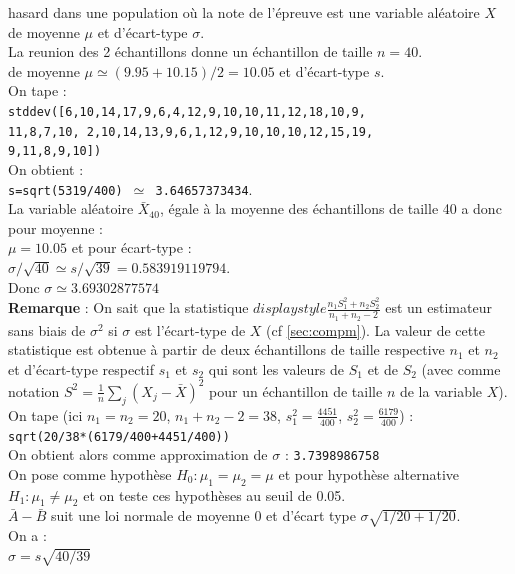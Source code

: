 \documentclass[a4paper,11pt]{book}
\begin{document}
\begin{itemize}
hasard dans une population o\`u la note de l'\'epreuve est une variable 
al\'eatoire $X$ de moyenne $\mu$ et d'\'ecart-type $\sigma$.\\
La reunion des 2 \'echantillons donne un \'echantillon de taille $n=40$.\\
de moyenne $\mu \simeq (9.95+10.15)/2=10.05$ et d'\'ecart-type $s$.\\
On tape :\\ 
{\tt stddev([6,10,14,17,9,6,4,12,9,10,10,11,12,18,10,9,\\
11,8,7,10, 2,10,14,13,9,6,1,12,9,10,10,10,12,15,19,}\\
{\tt 9,11,8,9,10])}\\
On obtient :\\
{\tt s=sqrt(5319/400) $\simeq$ 3.64657373434}.\\
La variable al\'eatoire $\bar X_{40}$, \'egale \`a la moyenne des \'echantillons de taille 40 a donc pour moyenne :\\
$\mu=10.05$ 
et pour \'ecart-type :\\
$\sigma/\sqrt{40}\simeq s/\sqrt{39}=0.583919119794$.\\
Donc $\sigma \simeq 3.69302877574$\\
{\bf Remarque} : On sait que la statistique 
$displaystyle \frac{n_1S_1^2+n_2S_2^2}{n_1+n_2-2}$
 est un estimateur sans biais de $\sigma^2$ si $\sigma$ est l'\'ecart-type de 
$X$ (cf \ref{sec:compm}). La valeur
de cette statistique est obtenue \`a partir de 
deux \'echantillons de taille 
respective $n_1$ et $n_2$ et d'\'ecart-type respectif $s_1$ et $s_2$ qui sont les valeurs de $S_1$ et de $S_2$ (avec comme notation 
$S^2=\frac{1}{n}\sum_j (X_j-\bar X)^2$ pour un \'echantillon de taille $n$ de la variable $X$). \\
On tape (ici $n_1=n_2=20$, $n_1+n_2-2=38$, $s_1^2=\frac{4451}{400}$, $s_2^2=\frac{6179}{400}$) :\\
{\tt sqrt(20/38*(6179/400+4451/400))}\\
On obtient alors comme approximation de $\sigma$ : {\tt  3.7398986758}\\
On pose comme hypoth\`ese $H_0 : \mu_1=\mu_2=\mu$ et pour hypoth\`ese
 alternative $H_1 : \mu_1 \neq \mu_2$ et on teste ces hypoth\`eses
 au seuil de 0.05.\\
$\bar A-\bar B$ suit une loi normale de
moyenne 0 et d'\'ecart type $\sigma\sqrt{1/20+1/20}$.\\
On a :\\
$\sigma=s\sqrt{40/39}$\\

\end{itemize}
\end{document}
